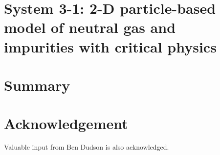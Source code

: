 \documentclass[11pt,twoside,a4paper]{article}
\begin{document}
\section{System 3-1: 2-D particle-based model of neutral gas and impurities with critical physics} \label{sec:sys3-1}

%
%
%
%
%
\clearpage
\section{Summary}\label{sec:summ}

\section*{Acknowledgement}\label{sec:ackn}

Valuable input from Ben Dudson is also acknowledged.



\end{document}
